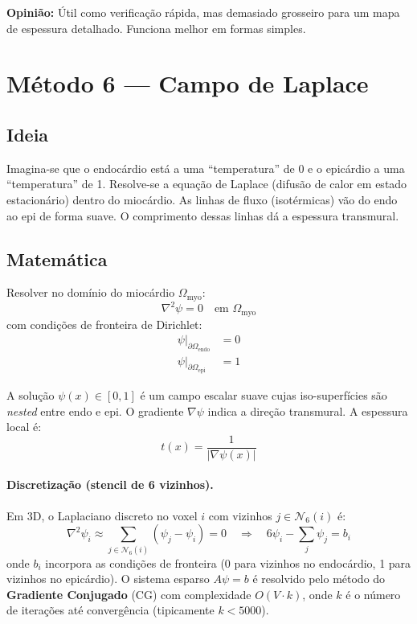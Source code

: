 \documentclass[a4paper,12pt]{article}
\begin{document}
\noindent\textbf{Opinião:} Útil como verificação rápida, mas demasiado
grosseiro para um mapa de espessura detalhado. Funciona melhor em formas
simples.

\section{Método 6 --- Campo de Laplace}
\label{sec:laplace}

\subsection{Ideia}
Imagina-se que o endocárdio está a uma ``temperatura'' de 0 e o epicárdio
a uma ``temperatura'' de 1. Resolve-se a equação de Laplace (difusão de
calor em estado estacionário) dentro do miocárdio. As linhas de fluxo
(isotérmicas) vão do endo ao epi de forma suave. O comprimento dessas
linhas dá a espessura transmural.

\subsection{Matemática}
Resolver no domínio do miocárdio $\Omega_{\text{myo}}$:
\begin{equation}
  \nabla^2 \psi = 0 \quad \text{em } \Omega_{\text{myo}}
\end{equation}
com condições de fronteira de Dirichlet:
\begin{align}
  \psi\big|_{\partial\Omega_{\text{endo}}} &= 0 \\
  \psi\big|_{\partial\Omega_{\text{epi}}} &= 1
\end{align}

A solução $\psi(x) \in [0, 1]$ é um campo escalar suave cujas
iso-superfícies são \emph{nested} entre endo e epi. O gradiente
$\nabla\psi$ indica a direção transmural. A espessura local é:
\begin{equation}
  t(x) = \frac{1}{|\nabla \psi(x)|}
\end{equation}

\paragraph{Discretização (stencil de 6 vizinhos).}
Em 3D, o Laplaciano discreto no voxel $i$ com vizinhos $j \in \mathcal{N}_6(i)$ é:
\begin{equation}
  \nabla^2 \psi_i \approx \sum_{j \in \mathcal{N}_6(i)} (\psi_j - \psi_i) = 0
  \quad \Longrightarrow \quad
  6\psi_i - \sum_{j} \psi_j = b_i
\end{equation}
onde $b_i$ incorpora as condições de fronteira (0 para vizinhos no
endocárdio, 1 para vizinhos no epicárdio). O sistema esparso
$A\psi = b$ é resolvido pelo método do \textbf{Gradiente Conjugado}
(CG) com complexidade $O(V \cdot k)$, onde $k$ é o número de iterações
até convergência (tipicamente $k < 5000$).
\end{document}
